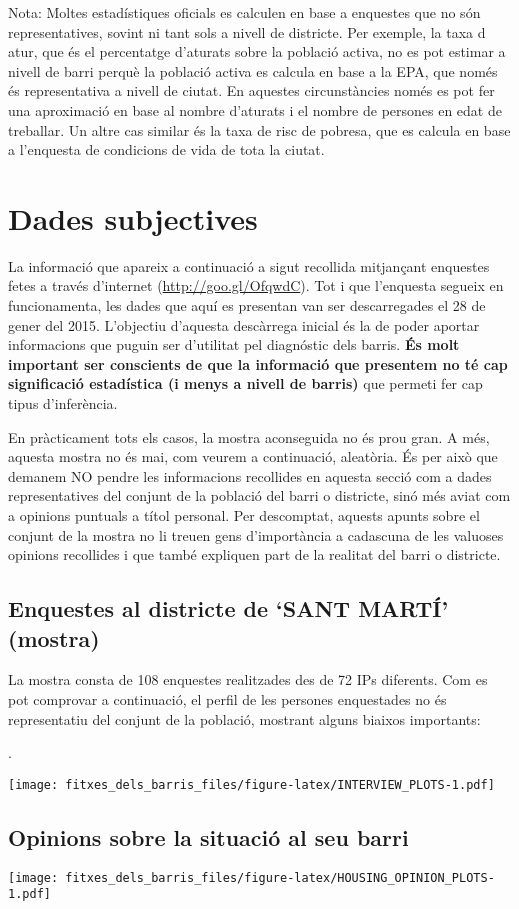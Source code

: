 \documentclass[]{article}
\begin{document}
Nota: Moltes estadístiques oficials es calculen en base a enquestes que
no són representatives, sovint ni tant sols a nivell de districte. Per
exemple, la taxa d atur, que és el percentatge d'aturats sobre la
població activa, no es pot estimar a nivell de barri perquè la població
activa es calcula en base a la EPA, que només és representativa a nivell
de ciutat. En aquestes circunstàncies només es pot fer una aproximació
en base al nombre d'aturats i el nombre de persones en edat de
treballar. Un altre cas similar és la taxa de risc de pobresa, que es
calcula en base a l'enquesta de condicions de vida de tota la ciutat.

\newpage

\section{\textbf{Dades subjectives}}\label{dades-subjectives}

La informació que apareix a continuació a sigut recollida mitjançant
enquestes fetes a través d'internet
(\href{http://goo.gl/OfqwdC}{\url{http://goo.gl/OfqwdC}}). Tot i que
l'enquesta segueix en funcionamenta, les dades que aquí es presentan van
ser descarregades el 28 de gener del 2015. L'objectiu d'aquesta
descàrrega inicial és la de poder aportar informacions que puguin ser
d'utilitat pel diagnóstic dels barris. \textbf{És molt important ser
conscients de que la informació que presentem no té cap significació
estadística (i menys a nivell de barris)} que permeti fer cap tipus
d'inferència.

En pràcticament tots els casos, la mostra aconseguida no és prou gran. A
més, aquesta mostra no és mai, com veurem a continuació, aleatòria. És
per això que demanem NO pendre les informacions recollides en aquesta
secció com a dades representatives del conjunt de la població del barri
o districte, sinó més aviat com a opinions puntuals a títol personal.
Per descomptat, aquests apunts sobre el conjunt de la mostra no li
treuen gens d'importància a cadascuna de les valuoses opinions
recollides i que també expliquen part de la realitat del barri o
districte.

\subsection{Enquestes al districte de `SANT MARTÍ'
(mostra)}\label{enquestes-al-districte-de-sant-marti-mostra}

La mostra consta de 108 enquestes realitzades des de 72 IPs diferents.
Com es pot comprovar a continuació, el perfil de les persones
enquestades no és representatiu del conjunt de la població, mostrant
alguns biaixos importants:

.

\texttt{[image: fitxes\_dels\_barris\_files/figure-latex/INTERVIEW\_PLOTS-1.pdf]}

\subsection{Opinions sobre la situació al seu
barri}\label{opinions-sobre-la-situacio-al-seu-barri}

\texttt{[image: fitxes\_dels\_barris\_files/figure-latex/HOUSING\_OPINION\_PLOTS-1.pdf]}
\end{document}

